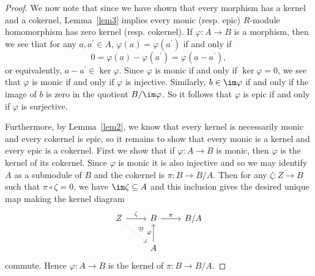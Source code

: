 \documentclass[10pt]{amsart}
\begin{document}
\begin{thm}
\begin{proof}
    We now note that since we have shown that every morphism has a kernel and a cokernel, Lemma~\ref{lem3} implies every monic (resp. epic) $R$-module homomorphism has zero kernel (resp. cokernel).
    If $\varphi : A \rightarrow B$ is a morphism, then we see that for any $a, a^\prime \in A$, $\varphi(a) = \varphi(a^\prime)$ if and only if
    $$0 = \varphi(a) - \varphi(a^\prime) = \varphi(a - a^\prime),$$
    or equivalently, $a - a^\prime \in \ker\varphi$.
    Since $\varphi$ is monic if and only if $\ker\varphi = 0$, we see that $\varphi$ is monic if and only if $\varphi$ is injective.
    Similarly, $b \in \im\varphi$ if and only if the image of $b$ is zero in the quotient $B/\im\varphi$.
    So it follows that $\varphi$ is epic if and only if $\varphi$ is surjective.

    Furthermore, by Lemma~\ref{lem2}, we know that every kernel is necessarily monic and every cokernel is epic, so it remains to show that every monic is a kernel and every epic is a cokernel.
    First we show that if $\varphi : A \rightarrow B$ is monic, then $\varphi$ is the kernel of its cokernel.
    Since $\varphi$ is monic it is also injective and so we may identify $A$ as a submodule of $B$ and the cokernel is $\pi : B \rightarrow B/A$.
    Then for any $\zeta : Z \rightarrow B$ such that $\pi \circ \zeta = 0$, we have $\im\zeta \subseteq A$ and this inclusion gives the desired unique map making the kernel diagram
    $$\begin{tikzcd}
      Z \arrow{r}{\zeta}\arrow[dotted]{rd}{\exists !} &B\arrow{r}{\pi} & B/A\\
      & A\arrow{u}{\varphi}
    \end{tikzcd}$$
    commute.
    Hence $\varphi : A \rightarrow B$ is the kernel of $\pi : B \rightarrow B/A$.


\end{proof}
\end{thm}
\end{document}
